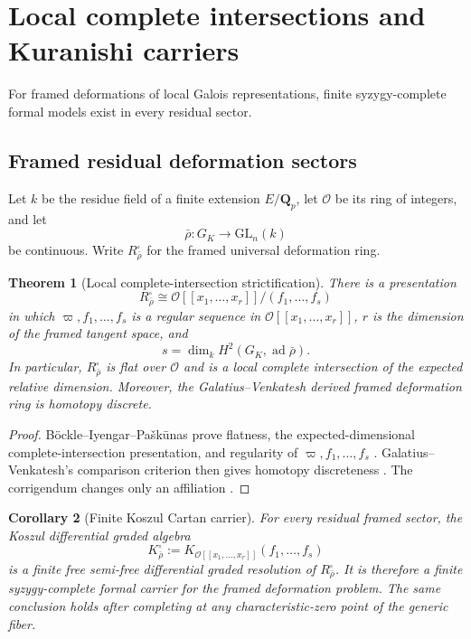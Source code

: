 \documentclass[11pt]{article}
\newtheorem{theorem}{Theorem}[section]
\newtheorem{corollary}[theorem]{Corollary}
\theoremstyle{definition}
\newcommand{\Qp}{\mathbf Q_p}
\begin{document}
\section{Local complete intersections and Kuranishi carriers}\label{sec:lci-carrier}

For framed deformations of local Galois representations, finite syzygy-complete formal models exist in every residual sector.

\subsection{Framed residual deformation sectors}

Let $k$ be the residue field of a finite extension $E/\Qp$, let $\mathcal O$ be its ring of integers, and let
\[
\bar\rho:G_K\longrightarrow \mathrm{GL}_n(k)
\]
be continuous.  Write $R_{\bar\rho}^{\square}$ for the framed universal deformation ring.

\begin{theorem}[Local complete-intersection strictification]\label{thm:local-lci}
There is a presentation
\begin{equation}\label{eq:lci-presentation}
R_{\bar\rho}^{\square}
\cong
\mathcal O[[x_1,\ldots,x_r]]/(f_1,\ldots,f_s)
\end{equation}
in which $\varpi,f_1,\ldots,f_s$ is a regular sequence in $\mathcal O[[x_1,\ldots,x_r]]$, $r$ is the dimension of the framed tangent space, and
\[
s=\dim_k H^2(G_K,\operatorname{ad}\bar\rho).
\]
In particular, $R_{\bar\rho}^{\square}$ is flat over $\mathcal O$ and is a local complete intersection of the expected relative dimension.  Moreover, the Galatius--Venkatesh derived framed deformation ring is homotopy discrete.
\end{theorem}

\begin{proof}
B\"ockle--Iyengar--Pa\v{s}k\=unas prove flatness, the expected-dimensional complete-intersection presentation, and regularity of $\varpi,f_1,\ldots,f_s$ \cite{BIPLocal}.  Galatius--Venkatesh's comparison criterion then gives homotopy discreteness \cite{GalatiusVenkatesh}.  The corrigendum changes only an affiliation \cite{BIPCorrigendum}.
\end{proof}

\begin{corollary}[Finite Koszul Cartan carrier]\label{cor:koszul-carrier}
For every residual framed sector, the Koszul differential graded algebra
\[
K_{\bar\rho}^{\square}
:=K_{\mathcal O[[x_1,\ldots,x_r]]}(f_1,\ldots,f_s)
\]
is a finite free semi-free differential graded resolution of $R_{\bar\rho}^{\square}$.  It is therefore a finite syzygy-complete formal carrier for the framed deformation problem.  The same conclusion holds after completing at any characteristic-zero point of the generic fiber.
\end{corollary}
\end{document}
